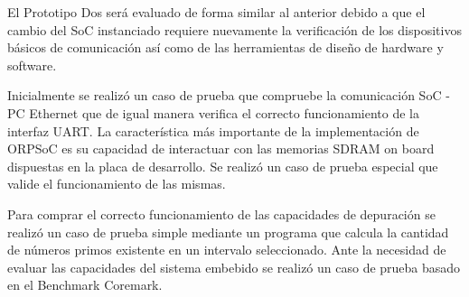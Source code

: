 		El Prototipo Dos será evaluado de forma similar al anterior debido a que el cambio del SoC instanciado requiere nuevamente la verificación de los
		dispositivos básicos de comunicación así como de las herramientas de diseño de hardware y software.
		
		Inicialmente se realizó un caso de prueba que compruebe la comunicación SoC - PC  Ethernet que de igual manera verifica el correcto funcionamiento
		de la interfaz UART. La característica más importante de la implementación de ORPSoC es su capacidad de interactuar con las memorias SDRAM on board
		dispuestas en la placa de desarrollo. Se realizó un caso de prueba especial que valide el funcionamiento de las mismas.

		Para comprar el correcto funcionamiento de las capacidades de depuración se realizó un caso de prueba simple mediante un programa que calcula la
		cantidad de números primos existente en un intervalo seleccionado. Ante la necesidad de evaluar las capacidades del sistema embebido se realizó un
		caso de prueba basado en el Benchmark Coremark.

